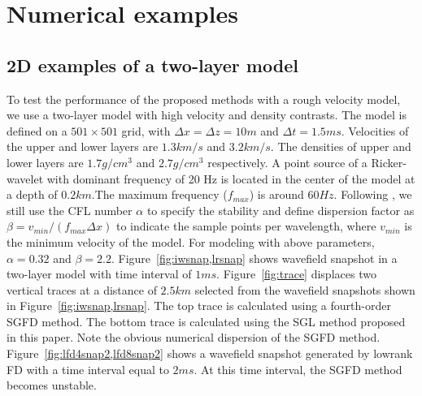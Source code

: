 \section{Numerical examples}

\subsection{2D examples of a two-layer model}

To test the performance of the proposed methods with a rough velocity model, we use a two-layer model with high velocity and density contrasts. The model is defined on a $501 \times 501$ grid, with $\Delta x=\Delta z=10 m$ and $\Delta t=1.5ms$.  Velocities of the upper and lower layers are $1.3 km/s$ and $3.2 km/s$. The densities of upper and lower layers are $1.7 g/cm^3$ and $2.7 g/cm^3$ respectively. A point source of a Ricker-wavelet with dominant frequency of 20 Hz is located in the center of the model at a depth of $0.2 km$.The maximum frequency ($f_{max}$) is around $60Hz$. Following \cite{songlfd}, we still use the CFL number $\alpha$ to specify the stability and define dispersion factor as $\beta=v_{min}/(f_{max}\Delta x)$ to indicate the sample points per wavelength, where $v_{min}$ is the minimum velocity of the model. For modeling with above parameters, $\alpha=0.32$ and $\beta=2.2$. Figure~\ref{fig:iwsnap,lrsnap} shows wavefield snapshot in a two-layer model with time interval of $1 ms$. Figure~\ref{fig:trace} displaces two vertical traces at a distance of $2.5 km$ selected from the wavefield snapshots shown in Figure~\ref{fig:iwsnap,lrsnap}. The top trace is calculated using a fourth-order SGFD method. The bottom trace is calculated using the SGL method proposed in this paper. Note the obvious numerical dispersion of the SGFD method. Figure~\ref{fig:lfd4snap2,lfd8snap2} shows a  wavefield snapshot generated by lowrank FD with a time interval equal to $2 ms$. At this time interval, the SGFD method becomes unstable. 



